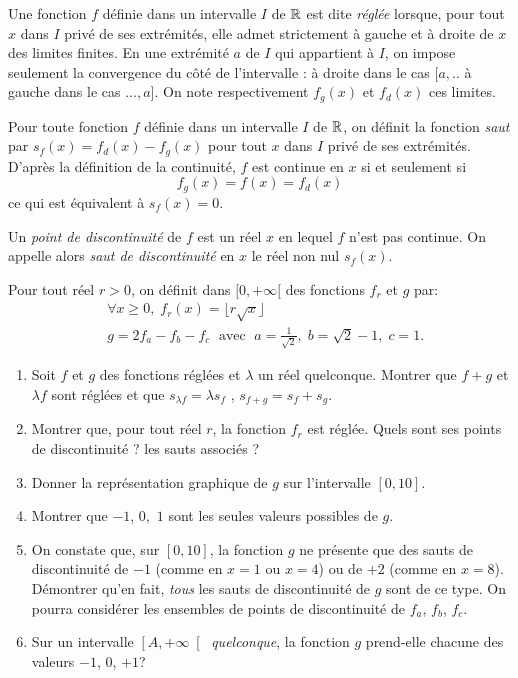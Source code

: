 Une fonction $f$ définie dans un intervalle $I$ de $\mathbb{R}$ est dite \emph{réglée} lorsque, pour tout $x$ dans $I$ privé de ses extrémités, elle admet strictement à gauche et à droite de $x$ des limites finites. En une extrémité $a$ de $I$ qui appartient à $I$, on impose seulement la convergence du côté de l'intervalle : à droite dans le cas $[a  ,.. $ à gauche dans le cas $ ... , a]$. On note respectivement $f_g(x)$ et $f_d(x)$ ces limites. 

Pour toute fonction $f$ définie dans un intervalle $I$ de $\mathbb{R}$, on définit la fonction \emph{saut} par $s_f(x)=f_d(x)-f_g(x)$ pour tout $x$ dans $I$ privé de ses extrémités.\newline 
D'après la définition de la continuité, $f$ est continue en $x$ si et seulement si 
\[
 f_g(x)=f(x)=f_d(x)
\] 
ce qui est équivalent à $s_f(x)=0$.

Un \emph{point de discontinuité} de $f$ est un réel $x$ en lequel $f$ n'est pas continue. On appelle alors \emph{saut de discontinuité} en $x$ le réel non nul $s_f(x)$. 

Pour tout r\'{e}el $r>0$, on d\'{e}finit dans $[0,+\infty[$ des fonctions  $f_r$ et $g$ par:
\begin{align*}
&\forall x\geq 0,\; f_r(x) = \lfloor r \sqrt{x}\rfloor \\
&g = 2f_a-f_b-f_c \; \text{ avec }\; a=\frac 1{\sqrt{2}},\; b=\sqrt{2}-1,\; c=1.
\end{align*}


\begin{enumerate}
\item Soit $f$ et $g$ des fonctions réglées et $\lambda$ un réel quelconque. Montrer que $f+g$ et $\lambda f$ sont réglées et que $s_{\lambda f} = \lambda s_f$ , $s_{f+g} = s_f + s_g$.

\item Montrer que, pour tout réel $r$, la fonction $f_r$ est réglée.  Quels sont ses points de discontinuit\'{e} ? les sauts associés ?

\item  Donner la repr\'{e}sentation graphique de $g$ sur l'intervalle $\left[ 0,10\right]$.

\item  Montrer que $-1$, $0,$ $1$ sont les seules valeurs possibles de $g$.

\item  On constate que, sur $\left[ 0,10\right] $, la fonction $g$ ne pr\'{e}sente que des sauts de discontinuit\'{e} de $-1$ (comme en $x=1$ ou $x=4$) ou de $+2$ (comme en $x=8$)$.$\newline
D\'{e}montrer qu'en fait, \emph{tous} les sauts de discontinuit\'{e} de $g$ sont de ce type. On pourra consid\'{e}rer les ensembles de points de discontinuit\'{e} de $f_{a}$, $f_{b}$, $f_{c}$.

\item  Sur un intervalle $\left[ A,+\infty \right[$ \emph{quelconque}, la fonction $g$ prend-elle chacune des valeurs $-1$, $0$, $+1$?
\end{enumerate}

